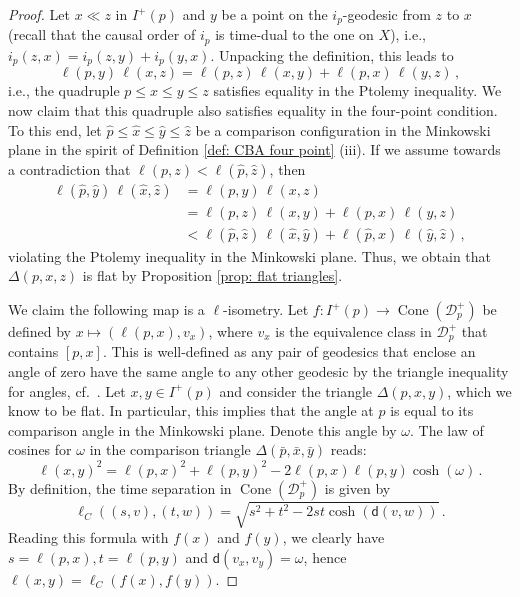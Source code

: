 \documentclass[hidelinks,12pt,a4paper]{article}
\numberwithin{equation}{section}
\theoremstyle{plain}
\theoremstyle{definition}
\DeclareMathOperator{\Cone}{Cone}
\newcommand*{\bx}{\bar{x}}
\newcommand*{\by}{\bar{y}}
\newcommand*{\bp}{\bar{p}}
\newcommand{\hx}{\hat{x}}
\newcommand{\hy}{\hat{y}}
\newcommand{\hz}{\hat{z}}
\newcommand{\hp}{\hat{p}}
\begin{document}
\begin{proof}
Let $x \ll z$ in $I^+(p)$ and $y$ be a point on the $i_p$-geodesic from $z$ to $x$ (recall that the causal order of $i_p$ is time-dual to the one on $X$), i.e., $i_p(z,x)=i_p(z,y)+i_p(y,x)$. 
Unpacking the definition, this leads to 
\[
\ell(p,y) \, \ell(x,z) = \ell(p,z) \, \ell(x,y) + \ell(p,x) \, \ell(y,z) \, ,
\]
i.e., the quadruple $p \leq x \leq y \leq z$ satisfies equality in the Ptolemy inequality. 
We now claim that this quadruple also satisfies equality in the four-point condition. 
To this end, let $\hp \leq \hx \leq \hy \leq \hz$ be a comparison configuration in the Minkowski plane in the spirit of Definition \ref{def: CBA four point} (iii). 
If we assume towards a contradiction that $\ell(p,z) < \ell(\hp,\hz)$, then
\begin{align*}
    \ell(\hp,\hy) \, \ell(\hx,\hz) & = \ell(p,y) \, \ell(x,z) \\ & = \ell(p,z) \, \ell(x,y) + \ell(p,x) \, \ell(y,z) \\ &< \ell(\hp,\hz)\, \ell(\hx,\hy) + \ell(\hp,\hx) \, \ell(\hy,\hz) \, ,
\end{align*}
violating the Ptolemy inequality in the Minkowski plane. 
Thus, we obtain that $\Delta(p,x,z)$ is flat by Proposition \ref{prop: flat triangles}. 

We claim the following map is a $\ell$-isometry. 
Let $f: I^+(p) \to \Cone(\mathcal{D}_p^+)$ be defined by $x \mapsto (\ell(p,x),v_x)$, where $v_x$ is the equivalence class in $\mathcal{D}_p^+$ that contains $[p,x]$.
This is well-defined as any pair of geodesics that enclose an angle of zero have the same angle to any other geodesic by the triangle inequality for angles, cf.\ \cite[Theorem 3.1]{BS23}. 
Let $x,y \in I^+(p)$ and consider the triangle $\Delta(p,x,y)$, which we know to be flat. 
In particular, this implies that the angle at $p$ is equal to its comparison angle in the Minkowski plane. 
Denote this angle by $\omega$.
The law of cosines for $\omega$ in the comparison triangle $\Delta(\bp,\bx,\by)$ reads: 
\begin{equation}
\ell(x,y)^2 = \ell(p,x)^2 + \ell(p,y)^2 - 2\ell(p,x)\ell(p,y)\cosh(\omega) \, .
\end{equation}
By definition, the time separation in $\Cone(\mathcal{D}_p^+)$ is given by 
\begin{equation}
\ell_C((s,v),(t,w))=\sqrt{s^2+t^2-2st\cosh(\mathsf d(v,w))} \, .
\end{equation}
Reading this formula with $f(x)$ and $f(y)$, we clearly have $s=\ell(p,x), t=\ell(p,y)$ and $\mathsf d(v_x,v_y)=\omega$, hence $\ell(x,y)=\ell_C(f(x),f(y))$. 
\end{proof}
\end{document}

